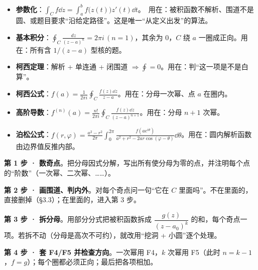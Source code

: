 
\flowerrule



\begin{itemize}
\item[\textbf{F1}] \textbf{参数化}：$\displaystyle\int_C f\dd z=\int_a^b f\bigl(z(t)\bigr)z'(t)\dd t$。\ 用在：被积函数不解析、围道不是圆、或题目要求“沿给定路径”。这是唯一“从定义出发”的算法。
\item[\textbf{F2}] \textbf{基本积分}：$\displaystyle\oint_C\frac{dz}{(z-a)^{n}}=2\pi i\,(n=1)$，其余为 $0$，$C$ 绕 $a$ 一圈成正向。用在：所有含 $1/(z-a)$ 型核的题。
\item[\textbf{F3}] \textbf{柯西定理}：解析 + 单连通 + 闭围道 $\Rightarrow\oint=0$。用在：判“这一项是不是白算”。
\item[\textbf{F4}] \textbf{柯西公式}：$\displaystyle f(a)=\frac{1}{2\pi i}\oint_C\frac{f(z)\dd z}{z-a}$。用在：分母一次幂、点 $a$ 在圈内。
\item[\textbf{F5}] \textbf{高阶导数}：$\displaystyle f^{(n)}(a)=\frac{n!}{2\pi i}\oint_C\frac{f(z)\dd z}{(z-a)^{n+1}}$。用在：分母 $n+1$ 次幂。
\item[\textbf{F6}] \textbf{泊松公式}：$\displaystyle f(r,\varphi)=\frac{a^{2}-r^{2}}{2\pi}\int_0^{2\pi}\frac{f(ae^{i\theta})}{a^{2}+r^{2}-2ar\cos(\varphi-\theta)}\dd\theta$。用在：圆内解析函数由边界值反推内部。
\end{itemize}


\textbf{第 1 步 · 数奇点}。把分母因式分解，写出所有使分母为零的点，并注明每个点的“阶数”（一次幂、二次幂、……）。

\textbf{第 2 步 · 画围道、判内外}。对每个奇点问一句“它在 $C$ 里面吗”。不在里面的，直接删掉（§3.3）；在里面的，进入第 3 步。

\textbf{第 3 步 · 拆分母}。用部分分式把被积函数拆成 $\dfrac{g(z)}{(z-a_0)^{k}}$ 的和，每个奇点一项。若拆不动（分母是高次不可约），就改用“挖洞 + 小圆”逐个处理。

\textbf{第 4 步 · 套 F4/F5 并检查方向}。一次幂用 F4，$k$ 次幂用 F5（此时 $n=k-1$，$f=g$）；每个圈都必须正向；最后把各项相加。


\flowerrule

